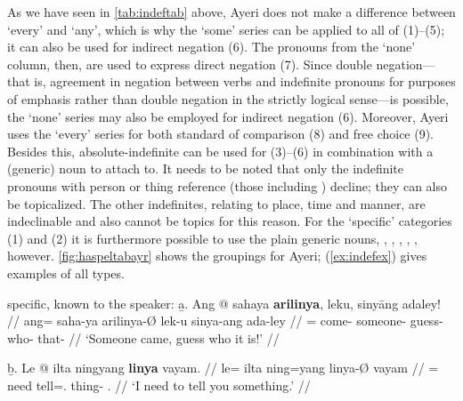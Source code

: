 As we have seen in \autoref{tab:indeftab} above, Ayeri does not make a
difference between `every' and `any', which is why the `some' series can be
applied to all of (1)--(5); it can also be used for indirect negation (6). The
pronouns from the `none' column, then, are used to express direct negation (7).
Since double negation---that is, agreement in negation between verbs and
indefinite pronouns for purposes of emphasis rather than double negation in the
strictly logical sense---is possible, the `none' series may also be employed
for indirect negation (6). Moreover, Ayeri uses the `every' series for both
standard of comparison (8) and free choice (9). Besides this, 
absolute-indefinite  can be used for (3)--(6) in combination 
with a (generic) noun to attach to. It needs to be noted that only the 
indefinite pronouns with person or thing reference (those including 
) decline; they can also be topicalized. The other indefinites, 
relating to place, time and manner, are indeclinable and also cannot be topics 
for this reason.
%
%
For the `specific' categories (1) and (2) it is furthermore possible to use the
plain generic nouns, , ,
, , , 
however. \autoref{fig:haspeltabayr} shows the groupings for Ayeri; 
(\ref{ex:indefex}) gives examples of all types.

\pex[labeltype=numeric,interpartskip=1em]\label{ex:indefex}
\a specific, known to the speaker:\vspace{.5em} %
	\beginsubsub
	\b{a.} \begingl
		\gla Ang @ sahaya \textbf{arilinya}, leku, sinyāng adaley! //
		\glb ang= saha-ya arilinya-Ø lek-u sinya-ang ada-ley //
		\glc \AgtT{}= come-\TsgM{} someone-\Top{} guess-\Imp{} 
			who-\Aarg{} that-\PargI{} //
		\glft `Someone came, guess who it is!' //
		\endgl\vspace{.5em}
		
	\b{b.} \begingl
		\gla Le @ ilta ningyang \textbf{linya} vayam. //
		\glb le= ilta ning=yang linya-Ø vayam //
		\glc \PatTI{}= need tell=\Fsg{}.\Aarg{} thing-\Top{} 
			\Second{}.\Dat{} //
		\glft `I need to tell you something.' //
		\endgl
	\endsubsub

